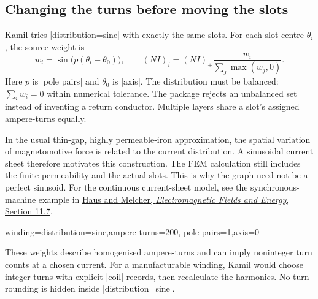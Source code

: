 
\subsection{Changing the turns before moving the slots}

Kamil tries |distribution=sine| with exactly the same slots. For each slot
centre $\theta_i$, the source weight is
\[
 w_i=\sin\bigl(p(\theta_i-\theta_0)\bigr),\qquad
 (NI)_i=(NI)_+\frac{w_i}{\sum_j\max(w_j,0)}.
\]
Here $p$ is |pole pairs| and $\theta_0$ is |axis|. The distribution must be
balanced: $\sum_i w_i=0$ within numerical tolerance. The package rejects an
unbalanced set instead of inventing a return conductor. Multiple layers
share a slot's assigned ampere-turns equally.

In the usual thin-gap, highly permeable-iron approximation, the spatial
variation of magnetomotive force is related to the current distribution.
A sinusoidal current sheet therefore motivates this construction. The FEM
calculation still includes the finite permeability and the actual slots.
This is why the graph need not be a perfect sinusoid. For the continuous
current-sheet model, see the synchronous-machine example in
\href{https://web.mit.edu/6.013_book/www/chapter11/11.7.html}{Haus and Melcher,
\emph{Electromagnetic Fields and Energy}, Section 11.7}.

\begin{codeexample}
winding={distribution=sine,ampere turns=200,
  pole pairs=1,axis=0}
\end{codeexample}

These weights describe homogenised ampere-turns and can imply noninteger
turn counts at a chosen current. For a manufacturable winding, Kamil would
choose integer turns with explicit |coil| records, then recalculate the
harmonics. No turn rounding is hidden inside |distribution=sine|.


\begin{codeexample}
\end{codeexample}

